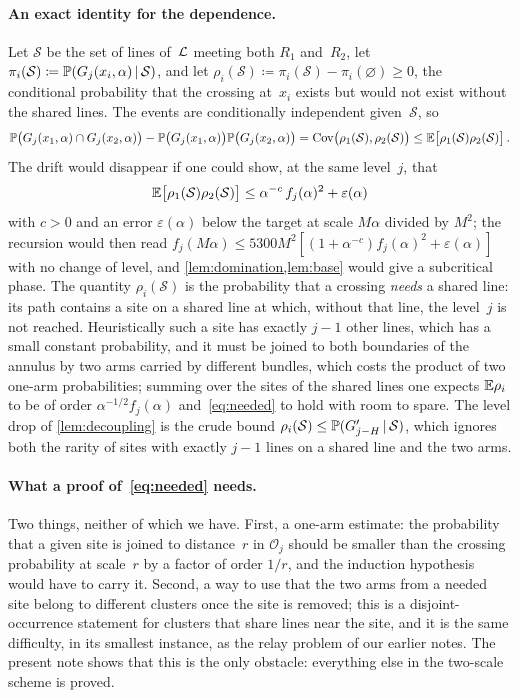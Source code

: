 \documentclass[11pt,letterpaper]{article}
\newcommand{\cO}{\mathcal O}
\newcommand{\cS}{\mathcal S}
\begin{document}
\paragraph{An exact identity for the dependence.} Let $\cS$ be the set of lines of~$\mathcal L$ meeting both $R_1$ and~$R_2$, let $\pi_i(\cS)\coloneqq\P(G_j(x_i,\alpha)\,\vert\,\cS)$, and let $\rho_i(\cS)\coloneqq\pi_i(\cS)-\pi_i(\varnothing)\ge0$, the conditional probability that the crossing at~$x_i$ exists but would not exist without the shared lines. The events are conditionally independent given~$\cS$, so
\begin{equation}
\label{eq:cov}
  \P\bigl(G_j(x_1,\alpha)\cap G_j(x_2,\alpha)\bigr)-\P\bigl(G_j(x_1,\alpha)\bigr)\P\bigl(G_j(x_2,\alpha)\bigr)=\mathrm{Cov}\bigl(\rho_1(\cS),\rho_2(\cS)\bigr)\le\E\bigl[\rho_1(\cS)\rho_2(\cS)\bigr]\,.
\end{equation}
The drift would disappear if one could show, at the same level~$j$, that
\begin{equation}
\label{eq:needed}
  \E\bigl[\rho_1(\cS)\rho_2(\cS)\bigr]\le\alpha^{-c}\,f_j(\alpha)^{2}+\varepsilon(\alpha)
\end{equation}
with $c>0$ and an error $\varepsilon(\alpha)$ below the target at scale $M\alpha$ divided by $M^2$; the recursion would then read $f_j(M\alpha)\le5300M^2[(1+\alpha^{-c})f_j(\alpha)^2+\varepsilon(\alpha)]$ with no change of level, and \cref{lem:domination,lem:base} would give a subcritical phase. The quantity $\rho_i(\cS)$ is the probability that a crossing \emph{needs} a shared line: its path contains a site on a shared line at which, without that line, the level~$j$ is not reached. Heuristically such a site has exactly $j-1$ other lines, which has a small constant probability, and it must be joined to both boundaries of the annulus by two arms carried by different bundles, which costs the product of two one-arm probabilities; summing over the sites of the shared lines one expects $\mathbb E\rho_i$ to be of order $\alpha^{-1/2}f_j(\alpha)$ and~\eqref{eq:needed} to hold with room to spare. The level drop of \cref{lem:decoupling} is the crude bound $\rho_i(\cS)\le\P(G'_{j-H}\,\vert\,\cS)$, which ignores both the rarity of sites with exactly $j-1$ lines on a shared line and the two arms.

\paragraph{What a proof of~\eqref{eq:needed} needs.} Two things, neither of which we have. First, a one-arm estimate: the probability that a given site is joined to distance~$r$ in $\cO_j$ should be smaller than the crossing probability at scale~$r$ by a factor of order $1/r$, and the induction hypothesis would have to carry it. Second, a way to use that the two arms from a needed site belong to different clusters once the site is removed; this is a disjoint-occurrence statement for clusters that share lines near the site, and it is the same difficulty, in its smallest instance, as the relay problem of our earlier notes. The present note shows that this is the only obstacle: everything else in the two-scale scheme is proved.
\end{document}
